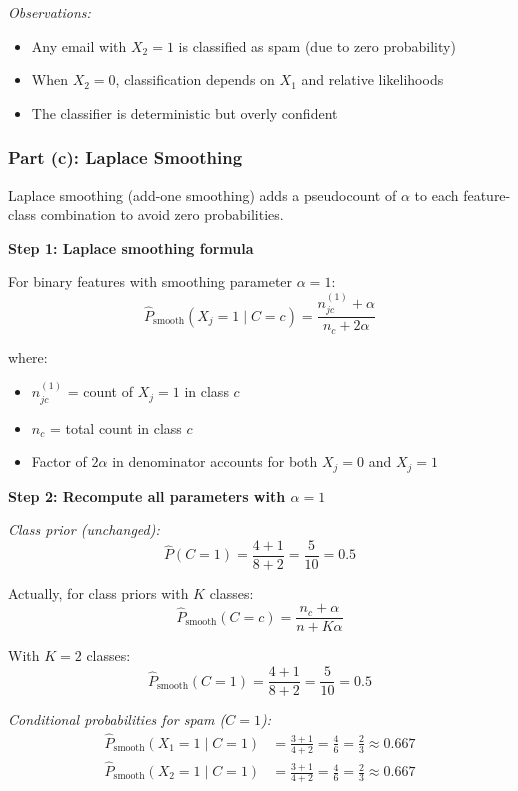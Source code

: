 \documentclass[12pt]{article}
\begin{document}
\begin{explanation}
\textit{Observations:}
\begin{itemize}
    \item Any email with $X_2 = 1$ is classified as spam (due to zero probability)
    \item When $X_2 = 0$, classification depends on $X_1$ and relative likelihoods
    \item The classifier is deterministic but overly confident
\end{itemize}
\end{explanation}

\subsubsection{Part (c): Laplace Smoothing}

\begin{solution}
Laplace smoothing (add-one smoothing) adds a pseudocount of $\alpha$ to each feature-class combination to avoid zero probabilities.

\textbf{Step 1: Laplace smoothing formula}

For binary features with smoothing parameter $\alpha = 1$:
\[
\hat{P}_{\text{smooth}}(X_j = 1 \mid C = c) = \frac{n_{jc}^{(1)} + \alpha}{n_c + 2\alpha}
\]

where:
\begin{itemize}
    \item $n_{jc}^{(1)}$ = count of $X_j = 1$ in class $c$
    \item $n_c$ = total count in class $c$
    \item Factor of $2\alpha$ in denominator accounts for both $X_j = 0$ and $X_j = 1$
\end{itemize}

\textbf{Step 2: Recompute all parameters with $\alpha = 1$}

\textit{Class prior (unchanged):}
\[
\hat{P}(C = 1) = \frac{4 + 1}{8 + 2} = \frac{5}{10} = 0.5
\]

Actually, for class priors with $K$ classes:
\[
\hat{P}_{\text{smooth}}(C = c) = \frac{n_c + \alpha}{n + K\alpha}
\]

With $K = 2$ classes:
\[
\hat{P}_{\text{smooth}}(C = 1) = \frac{4 + 1}{8 + 2} = \frac{5}{10} = 0.5
\]

\textit{Conditional probabilities for spam ($C = 1$):}
\begin{align}
\hat{P}_{\text{smooth}}(X_1 = 1 \mid C = 1) &= \frac{3 + 1}{4 + 2} = \frac{4}{6} = \frac{2}{3} \approx 0.667 \\
\hat{P}_{\text{smooth}}(X_2 = 1 \mid C = 1) &= \frac{3 + 1}{4 + 2} = \frac{4}{6} = \frac{2}{3} \approx 0.667
\end{align}


\end{solution}
\end{document}
